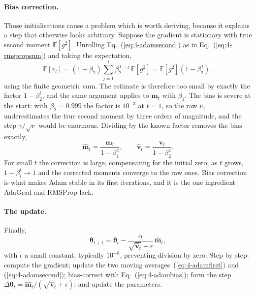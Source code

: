 \paragraph{Bias correction.}
Those initialisations cause a problem which is worth deriving, because it
explains a step that otherwise looks arbitrary.  Suppose the gradient is
stationary with true second moment $\mathbb{E}[g^{2}]$.  Unrolling
Eq.~(\ref{eq:4-adamsecond}) as in Eq.~(\ref{eq:4-rmspropsum}) and taking the
expectation,
\begin{equation}
  \mathbb{E}[v_t] = (1-\beta_2)\sum_{j=1}^{t}\beta_2^{\,t-j}\,\mathbb{E}[g^{2}]
   = \mathbb{E}[g^{2}]\left(1-\beta_2^{\,t}\right),
  \label{eq:4-adambiasderiv}
\end{equation}
using the finite geometric sum.  The estimate is therefore too small by
exactly the factor $1-\beta_2^{t}$, and the same argument applies to
$\bm{m}_t$ with $\beta_1$.  The bias is severe at the start: with
$\beta_2=0.999$ the factor is $10^{-3}$ at $t=1$, so the raw $v_1$ underestimates
the true second moment by three orders of magnitude, and the step
$\gamma/\sqrt{v}$ would be enormous.  Dividing by the known factor removes the
bias exactly,
\begin{equation}
  \hat{\bm{m}}_t = \frac{\bm{m}_t}{1-\beta_1^{\,t}},
  \qquad
  \hat{\bm{v}}_t = \frac{\bm{v}_t}{1-\beta_2^{\,t}} .
  \label{eq:4-adambias}
\end{equation}
For small $t$ the correction is large, compensating for the initial zero; as
$t$ grows, $1-\beta_i^{t}\to1$ and the corrected moments converge to the raw
ones.  Bias correction is what makes Adam stable in its first iterations, and
it is the one ingredient AdaGrad and RMSProp lack.

\paragraph{The update.}
Finally,
\begin{equation}
  \boxed{\;
  \bm{\theta}_{t+1} = \bm{\theta}_t
    - \frac{\alpha}{\sqrt{\hat{\bm{v}}_t}+\epsilon}\,\hat{\bm{m}}_t , \;}
  \label{eq:4-adam}
\end{equation}
with $\epsilon$ a small constant, typically $10^{-8}$, preventing division by
zero.  Step by step: compute the gradient; update the two moving
averages~(\ref{eq:4-adamfirst}) and (\ref{eq:4-adamsecond}); bias-correct with
Eq.~(\ref{eq:4-adambias}); form the step
$\Delta\bm{\theta}_t=\hat{\bm{m}}_t/(\sqrt{\hat{\bm{v}}_t}+\epsilon)$; and
update the parameters.

